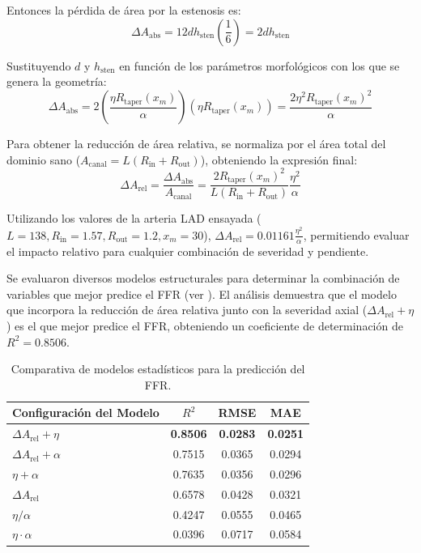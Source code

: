 \documentclass[12pt, letterpaper]{article}
\begin{document}
Entonces la pérdida de área por la estenosis es:
\begin{equation}
  \Delta A_{\text{abs}} = 12 d h_{\mathrm{sten}} \left( \frac{1}{6} \right) = 2 d h_{\mathrm{sten}}
\end{equation}

Sustituyendo $d$ y $h_{\mathrm{sten}}$ en función de los parámetros morfológicos con los que se genera la geometría:
\begin{equation*}
  \Delta A_{\text{abs}} = 2 \left( \frac{\eta R_{\mathrm{taper}}(x_m)}{\alpha} \right) (\eta R_{\mathrm{taper}}(x_m)) = \frac{2 \eta^2 R_{\mathrm{taper}}(x_m)^2}{\alpha}
\end{equation*}

Para obtener la reducción de área relativa, se normaliza por el área total del dominio sano ($A_{\text{canal}} = L(R_{\mathrm{in}} + R_{\mathrm{out}})$), obteniendo la expresión final:
\begin{equation}
  \label{eq:delta_a_rel_final}
  \Delta A_{\text{rel}} = \frac{\Delta A_{\text{abs}}}{A_{\text{canal}}} = \frac{2 R_{\mathrm{taper}}(x_m)^2}{L(R_{\mathrm{in}} + R_{\mathrm{out}})} \frac{\eta^2}{\alpha}
\end{equation}

Utilizando los valores de la arteria LAD ensayada ($L=138, R_{\mathrm{in}}=1.57, R_{\mathrm{out}}=1.2, x_m=30$), $\Delta A_{\text{rel}} = 0.01161 \frac{\eta^2}{\alpha}$, permitiendo evaluar el impacto relativo para cualquier combinación de severidad y pendiente.

Se evaluaron diversos modelos estructurales para determinar la combinación de variables que mejor predice el FFR (ver ). El análisis demuestra que el modelo que incorpora la reducción de área relativa junto con la severidad axial ($\Delta A_{\text{rel}} + \eta$) es el que mejor predice el FFR, obteniendo un coeficiente de determinación de $R^2 = 0.8506$.

\vspace{0.5cm}
\begin{table}[htbp]
  \centering
  \caption{Comparativa de modelos estadísticos para la predicción del FFR.}
  \label{tab:modelo_sem_resultados}
  \begin{tabular}{lccc}
    \hline
    \textbf{Configuración del Modelo} & $R^2$ & \textbf{RMSE} & \textbf{MAE} \\ \hline
    \textbf{$\Delta A_{\text{rel}} + \eta$} & \textbf{0.8506} & \textbf{0.0283} & \textbf{0.0251} \\
    $\Delta A_{\text{rel}} + \alpha$ & 0.7515 & 0.0365 & 0.0294 \\
    $\eta + \alpha$ & 0.7635 & 0.0356 & 0.0296 \\
    $\Delta A_{\text{rel}}$ & 0.6578 & 0.0428 & 0.0321 \\
    $\eta / \alpha$ & 0.4247 & 0.0555 & 0.0465 \\
    $\eta \cdot \alpha$ & 0.0396 & 0.0717 & 0.0584 \\ \hline
  \end{tabular}
\end{table}
\end{document}
